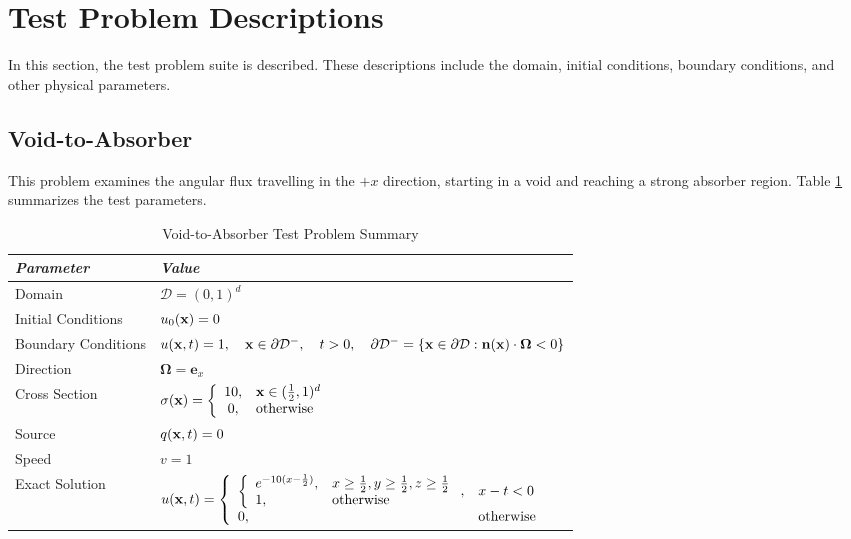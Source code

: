 \section{Test Problem Descriptions}
In this section, the test problem suite is described. These descriptions
include the domain, initial conditions, boundary conditions, and other
physical parameters.
\subsection{Void-to-Absorber}\label{sec:void_to_absorber}
This problem examines the angular flux travelling in the $+x$ direction,
starting in a void and reaching a strong absorber region.
Table \ref{tab:void_to_absorber} summarizes the test parameters.

\begin{table}[h]\caption{Void-to-Absorber Test Problem Summary}
\label{tab:void_to_absorber}
\centering
\begin{tabular}{l l}\toprule
\emph{Parameter} & \emph{Value}\\\midrule
Domain & $\mathcal{D} = (0,1)^d$\\
Initial Conditions & $u_0(\mathbf{x})=0$\\
Boundary Conditions & $u(\mathbf{x},t)=1,\quad \mathbf{x}\in\partial\mathcal{D}^-,\quad t>0,
   \quad\partial\mathcal{D}^-=\{\mathbf{x}\in\partial\mathcal{D}:\mathbf{n}(\mathbf{x})
   \cdot\mathbf{\Omega}<0\}$\\
Direction & $\mathbf{\Omega} = \mathbf{e}_x$\\
Cross Section & $\sigma(\mathbf{x})=\left\{\begin{array}{c l}
   10, & \mathbf{x}\in(\frac{1}{2},1)^d\\
   0,  & \mbox{otherwise}\end{array}\right.$\\
Source & $q(\mathbf{x},t)=0$\\
Speed & $v=1$\\
Exact Solution & $u(\mathbf{x},t)=\left\{\begin{array}{l l}
   \left\{\begin{array}{l l}
      e^{-10(x-\frac{1}{2})}, & x\ge\frac{1}{2}, y\ge\frac{1}{2}, z\ge\frac{1}{2}\\
      1,                      & \mbox{otherwise}
   \end{array}\right., & x-t<0\\
   0, & \mbox{otherwise}
   \end{array}\right.$ \\
\bottomrule\end{tabular}
\end{table}
